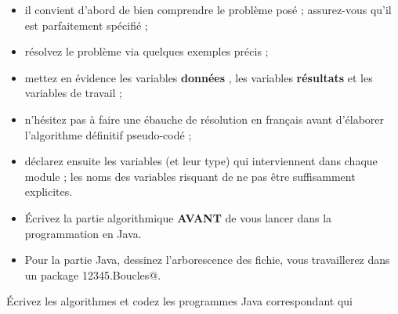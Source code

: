 \documentclass[11pt,a4paper]{article}
\begin{document}
					\begin{itemize}
				
			\item il convient d'abord de bien comprendre le probl\`eme pos\'e ; assurez-vous qu'il est parfaitement sp\'ecifi\'e ;
			\item r\'esolvez le probl\`eme via quelques exemples pr\'ecis ;
			\item mettez en \'evidence les variables \textbf{\guillemotleft  donn\'ees \guillemotright }, les variables \textbf{\guillemotleft  r\'esultats \guillemotright } et les variables de travail ;
			\item n'h\'esitez pas \`a faire une \'ebauche de r\'esolution en fran\c cais avant d'\'elaborer l'algorithme d\'efinitif pseudo-cod\'e ;
			\item d\'eclarez ensuite les variables (et leur type) qui interviennent dans chaque module ; les noms des variables risquant de ne pas \^etre suffisamment explicites.
			\item \'Ecrivez la partie algorithmique \textbf{AVANT} de vous lancer dans la programmation en Java.
			\item Pour la partie Java, dessinez l'arborescence des fichie, vous travaillerez dans un package  \verb@g12345.Boucles@. 
					\end{itemize}
				
            \par
        
        \'Ecrivez les algorithmes et codez les programmes Java correspondant qui 
          
\end{document}
